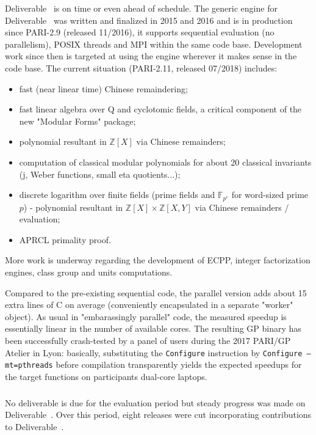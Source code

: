Deliverable~ is on time or even ahead of schedule.
The generic engine for Deliverable~ was written and
finalized in 2015 and 2016 and is in production since PARI-2.9 (released
11/2016), it supports sequential evaluation (no parallelism), POSIX threads and
MPI within the same code base.
Development work since then is targeted at using the engine wherever it makes
sense in the code base. The current situation (PARI-2.11, released 07/2018)
includes:
\begin{itemize}
\item fast (near linear time) Chinese remaindering;
\item fast linear algebra over Q and cyclotomic fields, a critical component of
the new "Modular Forms" package;
\item polynomial resultant in $\mathbb{Z}[X]$ via Chinese remainders;
\item computation of classical modular polynomials for about 20 classical
invariants (j, Weber functions, small eta quotients...);
\item discrete logarithm over finite fields (prime fields and
$\mathbb{F}_{p^e}$ for word-sized prime $p$) - polynomial resultant in
$\mathbb{Z}[X] \times \mathbb{Z}[X,Y]$ via 
Chinese remainders / evaluation;
\item APRCL primality proof.
\end{itemize}

More work is underway regarding the development of  ECPP, integer
factorization engines, class group and units computations.

Compared to the pre-existing sequential code, the parallel version adds about 15 extra lines of
C on average (conveniently encapsulated in a separate "worker" object). As usual
in "embarassingly parallel" code, the measured speedup is essentially linear in
the number of available cores. The resulting GP binary has been successfully
crash-tested by a panel of users during the 2017 PARI/GP Atelier in Lyon:
basically, substituting the \texttt{Configure} instruction by \texttt{Configure --mt=pthreads}
before compilation transparently yields the expected speedups for the target
functions on participants dual-core laptops. 


\subparagraph{}

No deliverable is due for the evaluation period but steady progress was made on
Deliverable~. Over this period, eight releases were cut
incorporating contributions to Deliverable~.

